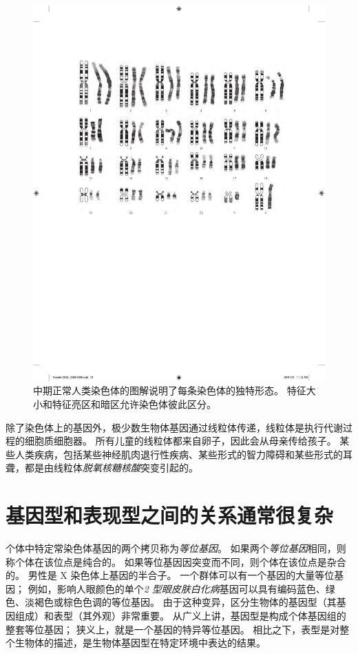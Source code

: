 \begin{figure}[htbp]
	\centering
	\includegraphics[width=0.95\linewidth]{chap02/fig_2_4}
	\caption{中期正常人类染色体的图解说明了每条染色体的独特形态。
		特征大小和特征亮区和暗区允许染色体彼此区分\cite{watoson1983recombinant}。}
	\label{fig:2_4}
\end{figure}


除了染色体上的基因外，极少数生物体基因通过线粒体传递，线粒体是执行代谢过程的细胞质细胞器。
所有儿童的线粒体都来自卵子，因此会从母亲传给孩子。
某些人类疾病，包括某些神经肌肉退行性疾病、某些形式的智力障碍和某些形式的耳聋，都是由线粒体\textit{脱氧核糖核酸}突变引起的。



\section{基因型和表现型之间的关系通常很复杂}

个体中特定常染色体基因的两个拷贝称为\textit{等位基因}。
如果两个\textit{等位基因}相同，则称个体在该位点是纯合的。
如果等位基因因突变而不同，则个体在该位点是杂合的。
男性是 X 染色体上基因的半合子。
一个群体可以有一个基因的大量等位基因；
例如，影响人眼颜色的单个\textit{2 型眼皮肤白化病}基因可以具有编码蓝色、绿色、淡褐色或棕色色调的等位基因。
由于这种变异，区分生物体的基因型（其基因组成）和表型（其外观）非常重要。
从广义上讲，基因型是构成个体基因组的整套等位基因；
狭义上，就是一个基因的特异等位基因。
相比之下，表型是对整个生物体的描述，是生物体基因型在特定环境中表达的结果。


